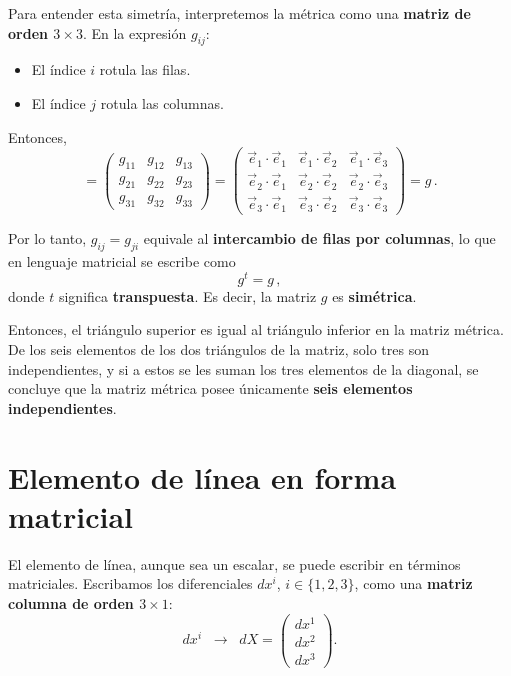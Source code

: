 \documentclass[../apunte_mecanica_clasica.tex]{subfiles}%
\begin{document}
Para entender esta simetría, interpretemos la métrica como una 
\textbf{matriz de orden $3 \times 3$}. En la expresión $g_{ij}$:
\begin{itemize}
    \item El índice $i$ rotula las filas.
    \item El índice $j$ rotula las columnas.
\end{itemize}

Entonces,
\begin{equation*}
    [g_{ij}] =
    \begin{pmatrix}
        g_{11} & g_{12} & g_{13} \\
        g_{21} & g_{22} & g_{23} \\
        g_{31} & g_{32} & g_{33}
    \end{pmatrix}
    =
    \begin{pmatrix}
        \vec{e}_1 \cdot \vec{e}_1 & \vec{e}_1 \cdot \vec{e}_2 & \vec{e}_1 \cdot \vec{e}_3 \\
        \vec{e}_2 \cdot \vec{e}_1 & \vec{e}_2 \cdot \vec{e}_2 & \vec{e}_2 \cdot \vec{e}_3 \\
        \vec{e}_3 \cdot \vec{e}_1 & \vec{e}_3 \cdot \vec{e}_2 & \vec{e}_3 \cdot \vec{e}_3
    \end{pmatrix}
    = g \,.
\end{equation*}

Por lo tanto, $g_{ij} = g_{ji}$ equivale al \textbf{intercambio de filas por 
columnas}, lo que en lenguaje matricial se escribe como
\begin{equation*}
    g^t = g \,,
\end{equation*}
donde $t$ significa \textbf{transpuesta}. Es decir, la matriz $g$ es 
\textbf{simétrica}.

Entonces, el triángulo superior es igual al triángulo inferior en la 
matriz métrica. De los seis elementos de los dos triángulos de la matriz, 
solo tres son independientes, y si a estos se les suman los tres elementos 
de la diagonal, se concluye que la matriz métrica posee únicamente 
\textbf{seis elementos independientes}.

\section{Elemento de línea en forma matricial}

El elemento de línea, aunque sea un escalar, se puede escribir en términos 
matriciales. Escribamos los diferenciales $dx^i$, $i\in\{1,2,3\}$, como una 
\textbf{matriz columna de orden $3 \times 1$}:
\begin{equation*}
    dx^i \;\;\longrightarrow\;\;
    dX =
    \begin{pmatrix}
        dx^1 \\
        dx^2 \\
        dx^3
    \end{pmatrix}.
\end{equation*}
\end{document}

